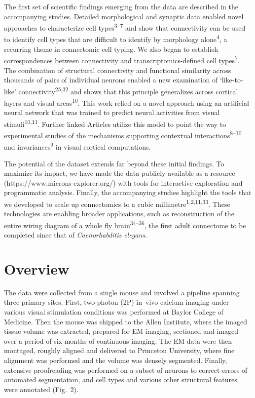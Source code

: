 \documentclass{article}
\begin{document}
The first set of scientific findings emerging from the data are described in the accompanying studies. Detailed morphological and synaptic data enabled novel approaches to characterize cell types\textsuperscript{3–7} and show that connectivity can be used to identify cell types that are difficult to identify by morphology alone\textsuperscript{4}, a recurring theme in connectomic cell typing. We also began to establish correspondences between connectivity and transcriptomics-defined cell types\textsuperscript{7}. The combination of structural connectivity and functional similarity across thousands of pairs of individual neurons enabled a new examination of ‘like-to-like’ connectivity\textsuperscript{25,32} and shows that this principle generalizes across cortical layers and visual areas\textsuperscript{10}. This work relied on a novel approach using an artificial neural network that was trained to predict neural activities from visual stimuli\textsuperscript{10,11}. Further linked Articles utilize this model to point the way to experimental studies of the mechanisms supporting contextual interactions\textsuperscript{8–10} and invariances\textsuperscript{9} in visual cortical computations.

The potential of the dataset extends far beyond these initial findings. To maximize its impact, we have made the data publicly available as a resource (https://www.microns-explorer.org/) with tools for interactive exploration and programmatic analysis. Finally, the accompanying studies highlight the tools that we developed to scale up connectomics to a cubic millimetre\textsuperscript{1,2,11,33}. These technologies are enabling broader applications, such as reconstruction of the entire wiring diagram of a whole fly brain\textsuperscript{34–36}, the first adult connectome to be completed since that of \emph{Caenorhabditis elegans}.

\section*{Overview}

The data were collected from a single mouse and involved a pipeline spanning three primary sites. First, two-photon (2P) in~vivo calcium imaging under various visual stimulation conditions was performed at Baylor College of Medicine. Then the mouse was shipped to the Allen Institute, where the imaged tissue volume was extracted, prepared for EM imaging, sectioned and imaged over a period of six months of continuous imaging. The EM data were then montaged, roughly aligned and delivered to Princeton University, where fine alignment was performed and the volume was densely segmented. Finally, extensive proofreading was performed on a subset of neurons to correct errors of automated segmentation, and cell types and various other structural features were annotated (Fig.~2).
\end{document}
